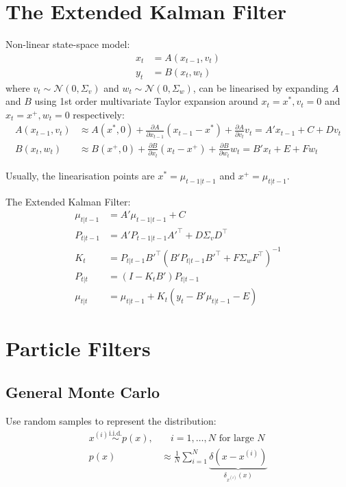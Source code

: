 \documentclass[12pt]{article}
\begin{document}
\section{The Extended Kalman Filter}
Non-linear state-space model:
\begin{align*}
    x_t &= A(x_{t-1}, v_t) \\
    y_t &= B(x_t, w_t)
\end{align*}
where $v_t \sim \mathcal{N}(0, \Sigma_v)$ and $w_t \sim \mathcal{N}(0, \Sigma_w)$, can be linearised by expanding $A$ and $B$ using 1st order multivariate Taylor expansion around $x_t = x^*, v_t = 0$ and  $x_t = x^+, w_t = 0$ respectively:
\begin{align*}
    A(x_{t-1}, v_t) &\approx A(x^*, 0) + \frac{\partial A}{\partial x_{t-1}} (x_{t-1} - x^*) + \frac{\partial A}{\partial v_t} v_t = A'x_{t-1} + C + Dv_t \\
    B(x_t, w_t) &\approx B(x^+, 0) + \frac{\partial B}{\partial x_t} (x_t - x^+) + \frac{\partial B}{\partial w_t} w_t = B' x_t + E + F w_t
\end{align*}

Usually, the linearisation points are $x^* = \mu_{t-1|t-1}$ and $x^+ = \mu_{t|t-1}$.

The Extended Kalman Filter:
\begin{align*}
\mu_{t | t-1} &= A' \mu_{t-1 | t-1} + C \\
P_{t|t-1} &= A' P_{t-1|t-1} A'^\top + D \Sigma_v D^\top \\
K_t &= P_{t|t-1} B'^\top (B' P_{t|t-1} B'^\top + F \Sigma_w F^\top)^{-1} \\
P_{t|t} &= (I - K_t B') P_{t | t-1} \\
\mu_{t|t} &= \mu_{t | t-1} + K_t (y_t - B' \mu_{t | t-1} - E)
\end{align*}

\section{Particle Filters}
\subsection*{General Monte Carlo}
Use random samples to represent the distribution:
\begin{align*}
    x^{(i)} \overset{\text{i.i.d.}}{\sim} p(x),& \quad i = 1, \dots, N \text{ for large } N \\
    p(x) &\approx \frac{1}{N} \sum_{i=1}^N \underbrace{\delta(x - x^{(i)})}_{\delta_{x^{(i)}}(x)}
\end{align*}
\end{document}
